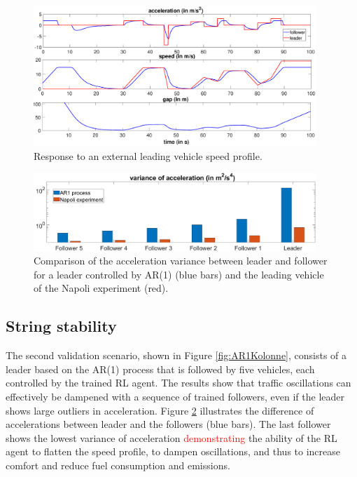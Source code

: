 \documentclass[review]{elsarticle}
\providecommand{\red}[1]{\textcolor{red}{#1}}
\providecommand{\martin}[1]{\red{#1}} %
\providecommand{\3}{{\ss}}
\begin{document}
\begin{figure}
	\centering
	\includegraphics[width=0.95\textwidth]{images/manipulatedLeader.eps}
	\caption{Response to an external leading vehicle speed
          profile.}
	\label{fig:manipulatedLeader}
\end{figure}

\begin{figure}
	\centering
	\includegraphics[width=0.95\textwidth]{images/VarAccComp}
	\caption{Comparison of the acceleration variance between
          leader and follower for a leader controlled by AR(1) (blue
          bars) and the leading vehicle of the Napoli experiment
          (red).}
	\label{fig:VarAccComp}
\end{figure}






\subsection{String stability}
\label{sec:stringStability}
The second validation scenario, shown in Figure
\ref{fig:AR1Kolonne}, consists of a leader based on the AR(1) process
that is
followed by five vehicles, each controlled by the trained RL
agent. The results show that traffic oscillations can effectively be
dampened with a sequence of trained followers, even if the leader
shows large outliers in acceleration. Figure \ref{fig:VarAccComp}
illustrates the difference of accelerations between leader and the
followers (blue bars). The last follower shows the lowest variance of
acceleration \martin{demonstrating} the ability of the RL agent to
flatten the speed profile, to dampen oscillations, and thus to increase
comfort and reduce fuel consumption and emissions.   
\end{document}
